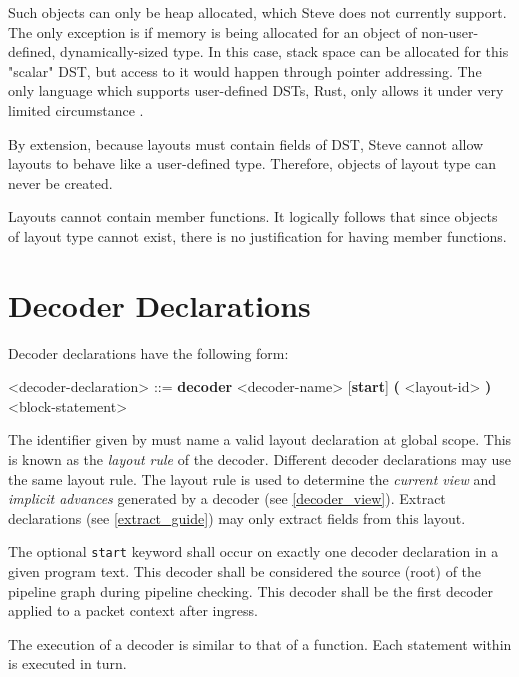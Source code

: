 Such objects can only be heap allocated, which Steve does not currently support. The only exception is if memory is being allocated for an object of non-user-defined, dynamically-sized type. In this case, stack space can be allocated for this "scalar" DST, but access to it would happen through pointer addressing. The only language which supports user-defined DSTs, Rust, only allows it under very limited circumstance \cite{rust_dst_std}.

By extension, because layouts must contain fields of DST, Steve cannot allow layouts to behave like a user-defined type. Therefore, objects of layout type can never be created.

Layouts cannot contain member functions. It logically follows that since objects of layout type cannot exist, there is no justification for having member functions.

\section{Decoder Declarations} \label{decoder_guide}

Decoder declarations have the following form:

\begin{minip}
\begin{grammar}
\singlespace
<decoder-declaration> ::=
\textbf{decoder} <decoder-name> [\textbf{start}]
\textbf{(} <layout-id> \textbf{)}
<block-statement>
\end{grammar}
\end{minip}

The identifier given by  must name a valid layout declaration at global scope. This  is known as the \textit{layout rule} of the decoder. Different decoder declarations may use the same layout rule. The layout rule is used to determine the \textit{current view} and \textit{implicit advances} generated by a decoder (see \ref{decoder_view}). Extract declarations (see \ref{extract_guide}) may only extract fields from this layout.

The optional \texttt{start} keyword shall occur on exactly one decoder declaration in a given program text. This decoder shall be considered the source (root) of the pipeline graph during pipeline checking. This decoder shall be the first decoder applied to a packet context after ingress.

The execution of a decoder is similar to that of a function. Each statement within  is executed in turn.

